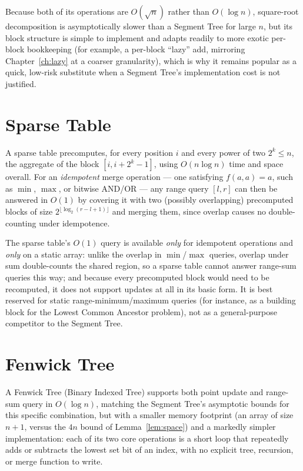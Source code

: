 \documentclass[
  11pt,
  a4paper,
  twoside=false,
  numbers=noenddot,
  headings=big,
  parskip=half,
  toc=bibliography,
  toc=listof,
  bibliography=totoc
]{scrreprt}
\newcounter{example}[chapter]
\newcommand{\Oh}[1]{O\!\left(#1\right)}
\begin{document}
Because both of its operations are $\Oh{\sqrt n}$ rather than $\Oh{\log n}$, square-root decomposition is asymptotically slower than a Segment Tree for large $n$, but its block structure is simple to implement and adapts readily to more exotic per-block bookkeeping (for example, a per-block ``lazy'' add, mirroring Chapter~\ref{ch:lazy} at a coarser granularity), which is why it remains popular as a quick, low-risk substitute when a Segment Tree's implementation cost is not justified.

\section{Sparse Table}
\label{sec:sparsetable}
A sparse table precomputes, for every position $i$ and every power of two $2^{k}\le n$, the aggregate of the block $[i,i+2^{k}-1]$, using $\Oh{n\log n}$ time and space overall. For an \emph{idempotent} merge operation --- one satisfying $f(a,a)=a$, such as $\min$, $\max$, or bitwise $\mathrm{AND}$/$\mathrm{OR}$ --- any range query $[l,r]$ can then be answered in $\Oh{1}$ by covering it with two (possibly overlapping) precomputed blocks of size $2^{\lfloor\log_2(r-l+1)\rfloor}$ and merging them, since overlap causes no double-counting under idempotence.

\begin{pitfall}
The sparse table's $\Oh{1}$ query is available \emph{only} for idempotent operations and \emph{only} on a static array: unlike the overlap in $\min$/$\max$ queries, overlap under sum double-counts the shared region, so a sparse table cannot answer range-sum queries this way; and because every precomputed block would need to be recomputed, it does not support updates at all in its basic form. It is best reserved for static range-minimum/maximum queries (for instance, as a building block for the Lowest Common Ancestor problem), not as a general-purpose competitor to the Segment Tree.
\end{pitfall}

\section{Fenwick Tree}
\label{sec:fenwick}
A Fenwick Tree (Binary Indexed Tree) supports both point update and range-sum query in $\Oh{\log n}$, matching the Segment Tree's asymptotic bounds for this specific combination, but with a smaller memory footprint (an array of size $n{+}1$, versus the $4n$ bound of Lemma~\ref{lem:space}) and a markedly simpler implementation: each of its two core operations is a short loop that repeatedly adds or subtracts the lowest set bit of an index, with no explicit tree, recursion, or merge function to write.
\end{document}
